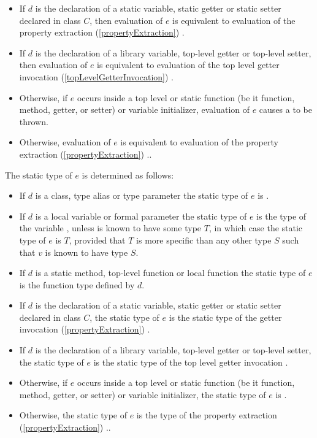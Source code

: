\documentclass{article}
\begin{document}
\begin{itemize}
\item If $d$ is the declaration of a static variable, static getter or static setter declared in class $C$, then evaluation of $e$ is equivalent to evaluation of the property extraction (\ref{propertyExtraction}) .
\item If $d$ is the declaration of a library variable, top-level getter or top-level setter, then evaluation of $e$ is equivalent to evaluation of the top level getter invocation (\ref{topLevelGetterInvocation}) \id.
\item Otherwise, if $e$ occurs inside a top level or static function (be it function, method, getter, or setter) or variable initializer, evaluation of $e$ causes a  to be thrown.
\item Otherwise, evaluation of $e$ is equivalent to evaluation of the property extraction (\ref{propertyExtraction}) \THIS{}.\id.
\end{itemize}

\LMHash{}
The static type of $e$ is determined as follows:

\begin{itemize}
\item If $d$ is a class, type alias or type parameter the static type of $e$ is .
\item If $d$ is a local variable or formal parameter the static type of $e$ is the type of the variable \id, unless \id{} is known to have some type $T$, in which case the static type of $e$ is $T$, provided that $T$ is more specific than any other type $S$ such that $v$ is known to have type $S$.
\item If $d$ is a static method, top-level function or local function the static type of $e$ is the function type defined by $d$.
\item If $d$ is the declaration of a static variable, static getter or static setter declared in class $C$, the static type of $e$ is the static type of the getter invocation (\ref{propertyExtraction}) .
\item If $d$ is the declaration of a library variable, top-level getter or top-level setter, the static type of $e$ is the static type of the top level getter invocation \id.
\item Otherwise, if $e$ occurs inside a top level or static function (be it function, method, getter, or setter) or variable initializer, the static type of $e$ is \DYNAMIC{}.
\item Otherwise, the static type of $e$ is the type of the property extraction (\ref{propertyExtraction}) \THIS{}.\id.
\end{itemize}
\end{document}
